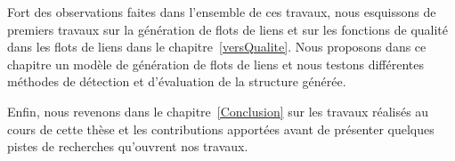 Fort des observations faites dans l'ensemble de ces travaux, nous esquissons de premiers travaux sur la génération de flots de liens et sur les fonctions de qualité dans les flots de liens dans le chapitre~\ref{versQualite}.
Nous proposons dans ce chapitre un modèle de génération de flots de liens et nous testons différentes méthodes de détection et d'évaluation de la structure générée.


Enfin, nous revenons dans le chapitre~\ref{Conclusion} sur les travaux réalisés au cours de cette thèse et les contributions apportées avant de présenter quelques pistes de recherches qu'ouvrent nos travaux.